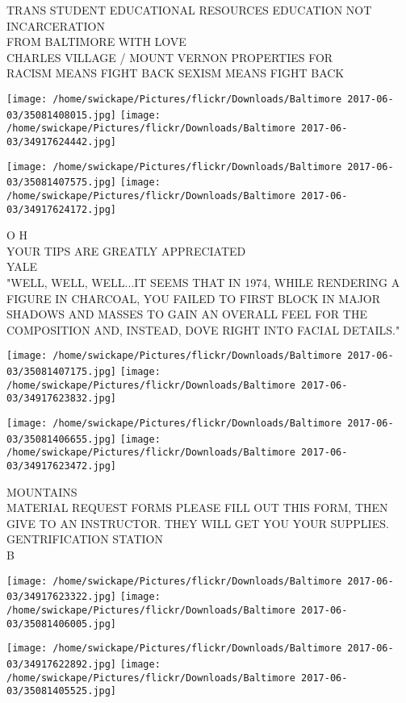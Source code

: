 \documentclass[10pt,letterpaper]{article}
\begin{document}
TRANS STUDENT EDUCATIONAL RESOURCES EDUCATION NOT INCARCERATION\\
FROM BALTIMORE WITH LOVE\\
CHARLES VILLAGE / MOUNT VERNON PROPERTIES FOR\\
RACISM MEANS FIGHT BACK SEXISM MEANS FIGHT BACK
\pagebreak

\texttt{[image: /home/swickape/Pictures/flickr/Downloads/Baltimore 2017-06-03/35081408015.jpg]}
\texttt{[image: /home/swickape/Pictures/flickr/Downloads/Baltimore 2017-06-03/34917624442.jpg]}

\texttt{[image: /home/swickape/Pictures/flickr/Downloads/Baltimore 2017-06-03/35081407575.jpg]}
\texttt{[image: /home/swickape/Pictures/flickr/Downloads/Baltimore 2017-06-03/34917624172.jpg]}

O H\\
YOUR TIPS ARE GREATLY APPRECIATED\\
YALE\\
"WELL, WELL, WELL...IT SEEMS THAT IN 1974, WHILE RENDERING A FIGURE IN CHARCOAL, YOU FAILED TO FIRST BLOCK IN MAJOR SHADOWS AND MASSES TO GAIN AN OVERALL FEEL FOR THE COMPOSITION AND, INSTEAD, DOVE RIGHT INTO FACIAL DETAILS."
\pagebreak

\texttt{[image: /home/swickape/Pictures/flickr/Downloads/Baltimore 2017-06-03/35081407175.jpg]}
\texttt{[image: /home/swickape/Pictures/flickr/Downloads/Baltimore 2017-06-03/34917623832.jpg]}

\texttt{[image: /home/swickape/Pictures/flickr/Downloads/Baltimore 2017-06-03/35081406655.jpg]}
\texttt{[image: /home/swickape/Pictures/flickr/Downloads/Baltimore 2017-06-03/34917623472.jpg]}

MOUNTAINS\\
MATERIAL REQUEST FORMS PLEASE FILL OUT THIS FORM, THEN GIVE TO AN INSTRUCTOR.  THEY WILL GET YOU YOUR SUPPLIES.\\
GENTRIFICATION STATION\\
B
\pagebreak

\texttt{[image: /home/swickape/Pictures/flickr/Downloads/Baltimore 2017-06-03/34917623322.jpg]}
\texttt{[image: /home/swickape/Pictures/flickr/Downloads/Baltimore 2017-06-03/35081406005.jpg]}

\texttt{[image: /home/swickape/Pictures/flickr/Downloads/Baltimore 2017-06-03/34917622892.jpg]}
\texttt{[image: /home/swickape/Pictures/flickr/Downloads/Baltimore 2017-06-03/35081405525.jpg]}
\end{document}
